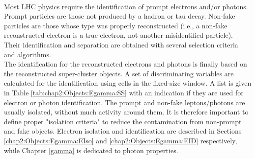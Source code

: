 \\
Most LHC physics require the identification of prompt electrons and/or photons. Prompt particles are those not produced by a hadron or tau decay. Non-fake particles are those whose type was properly reconstructed (i.e., a non-fake reconstructed electron is a true electron, not another misidentified particle). Their identification and separation are obtained with several selection criteria and algorithms. \\
The identification for the reconstructed electrons and photons is finally based on the reconstructed super-cluster objects. A set of discriminating variables are calculated for the identification using cells in the fixed-size window. A list is given in Table \ref{tab:chap2:Objects:Egamma:SS} with an indication if they are used for electron or photon identification. The prompt and non-fake leptons/photons are usually isolated, without much activity around them. It is therefore important to define proper "isolation criteria" to reduce the contamination from non-prompt and fake objects. Electron isolation and identification are described in Sections \ref{chap2:Objects:Egamma:EIso} and \ref{chap2:Objects:Egamma:EID} respectively, while Chapter \ref{gamma} is dedicated to photon properties.
